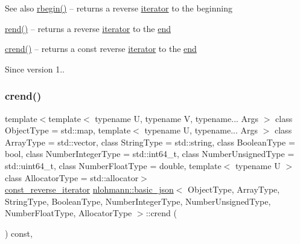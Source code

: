\begin{DoxySeeAlso}{See also}
\hyperlink{classnlohmann_1_1basic__json_a62ccf5b9b3674aec2403fbc02da03db8}{rbegin()} -- returns a reverse \hyperlink{classnlohmann_1_1basic__json_1_1iterator}{iterator} to the beginning 

\hyperlink{classnlohmann_1_1basic__json_aaa160a960dd3dd90856a72b1d8dbe707}{rend()} -- returns a reverse \hyperlink{classnlohmann_1_1basic__json_1_1iterator}{iterator} to the \hyperlink{classnlohmann_1_1basic__json_a12ccf14d39ddae52f6c7e126105a230b}{end} 

\hyperlink{classnlohmann_1_1basic__json_aa7084e62b93ef0236698b246a58bb2da}{crend()} -- returns a const reverse \hyperlink{classnlohmann_1_1basic__json_1_1iterator}{iterator} to the \hyperlink{classnlohmann_1_1basic__json_a12ccf14d39ddae52f6c7e126105a230b}{end}
\end{DoxySeeAlso}
\begin{DoxySince}{Since}
version 1.. 
\end{DoxySince}
\hypertarget{classnlohmann_1_1basic__json_aa7084e62b93ef0236698b246a58bb2da}{}\label{classnlohmann_1_1basic__json_aa7084e62b93ef0236698b246a58bb2da} 
\subsubsection{\texorpdfstring{crend()}{crend()}}
{\footnotesize\ttfamily template$<$template$<$ typename U, typename V, typename... Args $>$ class Object\+Type = std\+::map, template$<$ typename U, typename... Args $>$ class Array\+Type = std\+::vector, class String\+Type  = std\+::string, class Boolean\+Type  = bool, class Number\+Integer\+Type  = std\+::int64\+\_\+t, class Number\+Unsigned\+Type  = std\+::uint64\+\_\+t, class Number\+Float\+Type  = double, template$<$ typename U $>$ class Allocator\+Type = std\+::allocator$>$ \\
\hyperlink{classnlohmann_1_1basic__json_ae336fff01f4b78e3e16e5008dc8dbc00}{const\+\_\+reverse\+\_\+iterator} \hyperlink{classnlohmann_1_1basic__json}{nlohmann\+::basic\+\_\+json}$<$ Object\+Type, Array\+Type, String\+Type, Boolean\+Type, Number\+Integer\+Type, Number\+Unsigned\+Type, Number\+Float\+Type, Allocator\+Type $>$\+::crend (\begin{DoxyParamCaption}{ }\end{DoxyParamCaption}) const\hspace{0.3cm}{\ttfamily [inline]}, {\ttfamily [noexcept]}}



